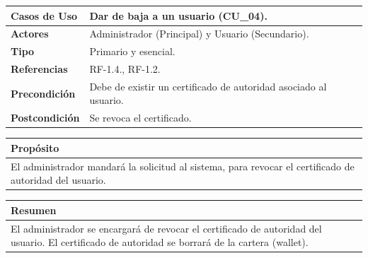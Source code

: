 \begin{itemize}
    \begin{table}[h!]
        \centering
        \begin{tabular}{|l|p{}|}
            \hline
            \textbf{Casos de Uso}   &   Dar de baja a un usuario (CU\_04). \\
            \hline 
            \textbf{Actores}        &   Administrador (Principal) y Usuario (Secundario). \\ 
            \hline 
            \textbf{Tipo}           &   Primario y esencial. \\ 
            \hline
            \textbf{Referencias}    &   RF-1.4., RF-1.2.\\ 
            \hline
            \textbf{Precondición}   &   Debe de existir un certificado de autoridad asociado al usuario.\\ 
            \hline
            \textbf{Postcondición}  &   Se revoca el certificado.\\ 
            \hline
        \end{tabular}
        
        \vspace{5mm}
        
        \begin{tabular}{|p{\textwidth}|}
            \hline
            \rowcolor{SeaGreen} \textbf{Propósito} \\
            \hline
            \multicolumn{1}{|p{12cm}|}{El administrador mandará la solicitud al sistema, para revocar el certificado
            de autoridad del usuario.} \\ [0.5ex]
            \hline
        \end{tabular}
        
        \vspace{5mm}
        
        \begin{tabular}{|p{\textwidth}|}
            \hline
            \rowcolor{SeaGreen} \textbf{Resumen} \\
            \hline
            \multicolumn{1}{|p{12cm}|}{El administrador se encargará de revocar el certificado de autoridad del usuario.
            El certificado de autoridad se borrará de la cartera (wallet).} \\ [0.5ex]
            \hline
        \end{tabular}
        
        \vspace{5mm}
        

\end{table}
\end{itemize}
